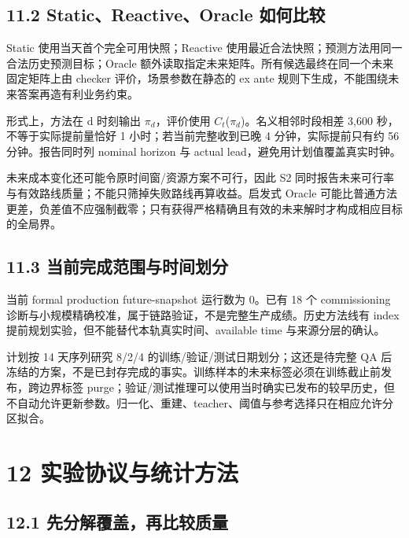 \documentclass[UTF8,10pt,a4paper,fontset=fandol]{ctexart}
\begin{document}
\subsection*{11.2 Static、Reactive、Oracle 如何比较}


Static 使用当天首个完全可用快照；Reactive 使用最近合法快照；预测方法用同一合法历史预测目标；Oracle 额外读取指定未来矩阵。所有候选最终在同一个未来固定矩阵上由 checker 评价，场景参数在静态的 ex ante 规则下生成，不能围绕未来答案再造有利业务约束。


形式上，方法在 d 时刻输出 \ensuremath{\pi_{d}}，评价使用 \ensuremath{C_{t}}(\ensuremath{\pi_{d}})。名义相邻时段相差 3,600 秒，不等于实际提前量恰好 1 小时；若当前完整收到已晚 4 分钟，实际提前只有约 56 分钟。报告同时列 nominal horizon 与 actual lead，避免用计划值覆盖真实时钟。


未来成本变化还可能令原时间窗/\allowbreak{}资源方案不可行，因此 S2 同时报告未来可行率与有效路线质量；不能只筛掉失败路线再算收益。启发式 Oracle 可能比普通方法更差，负差值不应强制截零；只有获得严格精确且有效的未来解时才构成相应目标的全局界。


\subsection*{11.3 当前完成范围与时间划分}


当前 formal production future-snapshot 运行数为 0。已有 18 个 commissioning 诊断与小规模精确校准，属于链路验证，不是完整生产成绩。历史方法线有 index 提前规划实验，但不能替代本轨真实时间、available time 与来源分层的确认。


计划按 14 天序列研究 8/\allowbreak{}2/\allowbreak{}4 的训练/\allowbreak{}验证/\allowbreak{}测试日期划分；这还是待完整 QA 后冻结的方案，不是已封存完成的事实。训练样本的未来标签必须在训练截止前发布，跨边界标签 purge；验证/\allowbreak{}测试推理可以使用当时确实已发布的较早历史，但不自动允许更新参数。归一化、重建、teacher、阈值与参考选择只在相应允许分区拟合。


\section*{12 实验协议与统计方法}


\subsection*{12.1 先分解覆盖，再比较质量}
\end{document}
